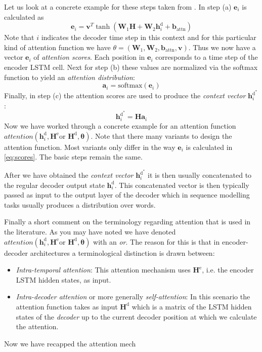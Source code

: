 \documentclass[11pt]{article}
\theoremstyle{definition}
\begin{document}
Let us look at a concrete example for these steps taken from \cite{see_get_2017}. In step (a) $\mathbf{e}_i$ is calculated as
\begin{equation}
	\mathbf{e}_i = \mathbf{v}^T\tanh(\mathbf{W}_1\mathbf{H} + \mathbf{W}_2 \mathbf{h}^{\text{d}}_i + \mathbf{b}_{\text{attn}})
	\label{eq:scores}
\end{equation}
Note that $i$ indicates the decoder time step in this context and for this particular kind of attention function we have $\theta = (\mathbf{W}_1,  \mathbf{W}_2, \mathbf{b}_{\text{attn}}, \mathbf{v})$. Thus we now have a vector $\mathbf{e}_i$ of \textit{attention scores}. Each position in $\mathbf{e}_i$ corresponds to a time step of the encoder LSTM cell. Next for step (b) these values are normalized via the softmax function to yield an \textit{attention distribution}:
\begin{equation}
	\mathbf{a}_i = \text{softmax}(\mathbf{e}_i)
	\label{eq:dist}
\end{equation}
Finally, in step (c) the attention scores are used to produce the \textit{context vector} $\mathbf{h}^{\text{d}^*}_i$:
\begin{equation}
	\mathbf{h}^{\text{d}^*}_i = \mathbf{H}\mathbf{a}_i
	\label{eq:context}
\end{equation}
Now we have worked through a concrete example for an attention function $attention(\mathbf{h}^{\text{d}}_i, \mathbf{H}^{\text{e}} \text{or } \mathbf{H}^{\text{d}}, \mathbf{\theta})$. Note that there many variants to design the attention function. Most variants only differ in the way $\mathbf{e}_i$ is calculated in \autoref{eq:scores}. The basic steps remain the same. 
\par 
After we have obtained the \textit{context vector} $\mathbf{h}^{\text{d}^*}_i$ it is then usually concatenated to the regular decoder output state $\mathbf{h}^{\text{d}}_i$. This concatenated vector is then typically passed as input to the output layer of the decoder which in sequence modelling tasks usually produces a distribution over words.
\par
Finally a short comment on the terminology regarding attention that is used in the literature. As you may have noted we have denoted  $attention(\mathbf{h}^{\text{d}}_i, \mathbf{H}^{\text{e}} \text{or } \mathbf{H}^{\text{d}}, \mathbf{\theta})$ with an \textit{or}. The reason for this is that in encoder-decoder architectures a terminological distinction is drawn between:
\begin{itemize}
	\item \textit{Intra-temporal attention}: This attention mechanism uses $\mathbf{H}^{\text{e}}$, i.e. the encoder LSTM hidden states, as input.
	\item \textit{Intra-decoder attention} or more generally \textit{self-attention}: In this scenario the attention function takes as input $\mathbf{H}^{\text{d}}$ which is a matrix of the LSTM hidden states of the \textit{decoder} up to the current decoder position at which we calculate the attention.
\end{itemize}
Now we have recapped the attention mech




%


\appendix
\end{document}
